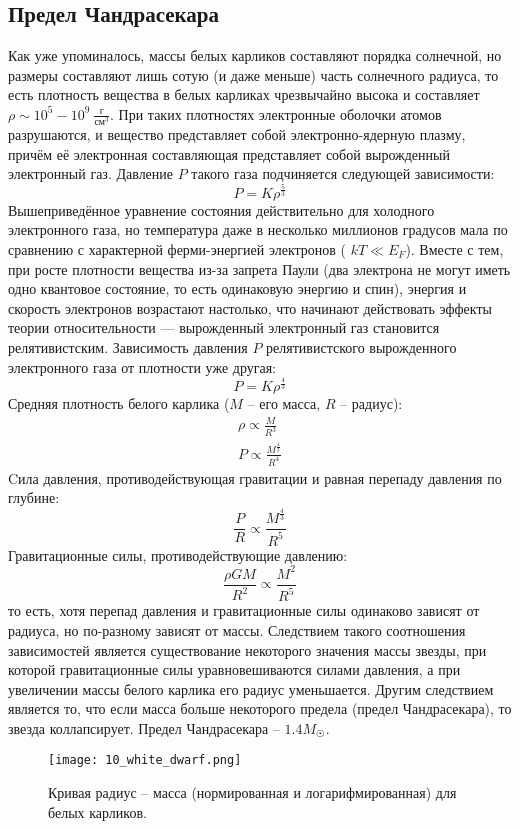 \subsection{Предел Чандрасекара}
Как уже упоминалось, массы белых карликов составляют порядка солнечной, но размеры составляют лишь сотую (и даже меньше) часть солнечного радиуса, то есть плотность вещества в белых карликах чрезвычайно высока и составляет $\rho \sim 10^{5}-10^{9} \ \frac{\text{г}}{\text{см}^{3}} $. При таких плотностях электронные оболочки атомов разрушаются, и вещество представляет собой электронно-ядерную плазму, причём её электронная составляющая представляет собой вырожденный электронный газ. Давление $P$ такого газа подчиняется следующей зависимости:
\begin{equation*}
    P = K\rho^{\frac{5}{3}}
\end{equation*}
Вышеприведённое уравнение состояния действительно для холодного электронного газа, но температура даже в несколько миллионов градусов мала по сравнению с характерной ферми-энергией электронов (
$kT\ll E_{F}$). Вместе с тем, при росте плотности вещества из-за запрета Паули (два электрона не могут иметь одно квантовое состояние, то есть одинаковую энергию и спин), энергия и скорость электронов возрастают настолько, что начинают действовать эффекты теории относительности — вырожденный электронный газ становится релятивистским. Зависимость давления $P$ релятивистского вырожденного электронного газа от плотности уже другая:
\begin{equation*}
    P = K\rho^{\frac{4}{3}}
\end{equation*}
Средняя плотность белого карлика ($M$ -- его масса, $R$ -- радиус):
\begin{gather*}
    \rho \propto \frac{M}{R^{3}}\\
    P\propto \frac{M^{\frac{4}{3}}}{R^{4}}
\end{gather*}
Cила давления, противодействующая гравитации и равная перепаду давления по глубине:
\begin{equation*}
    \frac{P}{R}\propto \frac{M^{\frac{4}{3}}}{R^{5}}
\end{equation*}
Гравитационные силы, противодействующие давлению:
\begin{equation*}
    \frac{\rho G M}{R^{2}} \propto \frac{M^{2}}{R^{5}}
\end{equation*}
то есть, хотя перепад давления и гравитационные силы одинаково зависят от радиуса, но по-разному зависят от массы. Следствием такого соотношения зависимостей является существование некоторого значения массы звезды, при которой гравитационные силы уравновешиваются силами давления, а при увеличении массы белого карлика его радиус уменьшается. Другим следствием является то, что если масса больше некоторого предела (предел Чандрасекара), то звезда коллапсирует. Предел Чандрасекара -- $1.4M_{\Sun}$. 
\begin{figure}[H]
    \centering
    \texttt{[image: 10\_white\_dwarf.png]}
    \caption{Кривая радиус -- масса (нормированная и логарифмированная) для белых карликов.}
    \label{fig:wd}
\end{figure}
